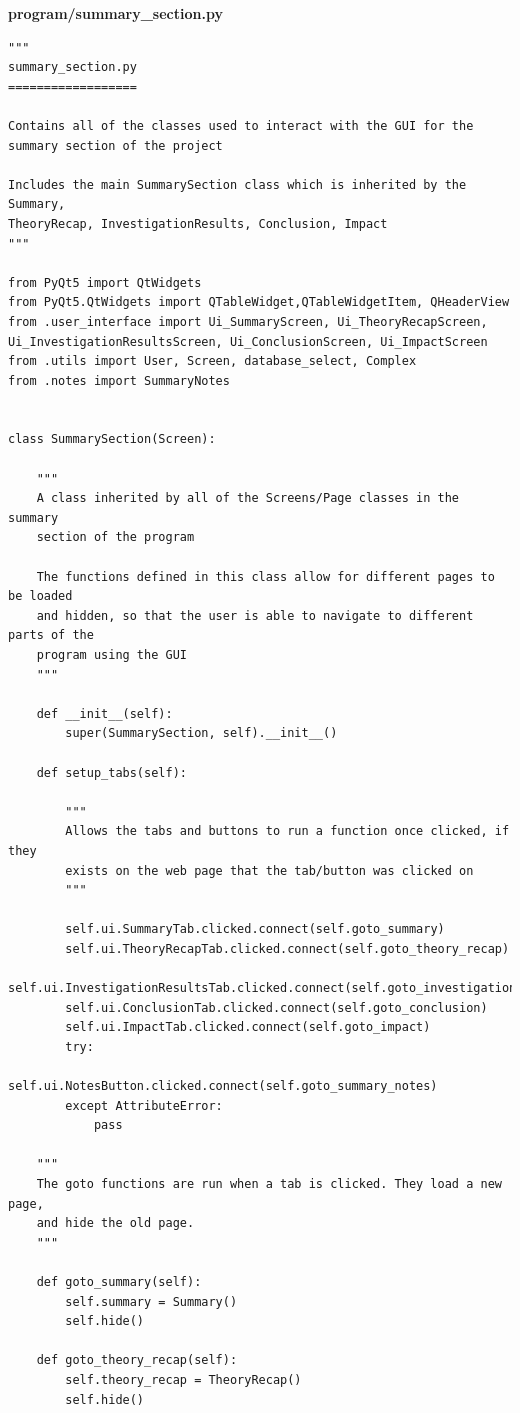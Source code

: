 \documentclass{article}
\begin{document}
\clearpage
\textbf{program/summary\_section.py}

\begin{lstlisting}
"""
summary_section.py
==================

Contains all of the classes used to interact with the GUI for the
summary section of the project

Includes the main SummarySection class which is inherited by the Summary,
TheoryRecap, InvestigationResults, Conclusion, Impact
"""

from PyQt5 import QtWidgets
from PyQt5.QtWidgets import QTableWidget,QTableWidgetItem, QHeaderView
from .user_interface import Ui_SummaryScreen, Ui_TheoryRecapScreen, Ui_InvestigationResultsScreen, Ui_ConclusionScreen, Ui_ImpactScreen
from .utils import User, Screen, database_select, Complex
from .notes import SummaryNotes


class SummarySection(Screen):

    """
    A class inherited by all of the Screens/Page classes in the summary
    section of the program

    The functions defined in this class allow for different pages to be loaded
    and hidden, so that the user is able to navigate to different parts of the
    program using the GUI
    """

    def __init__(self):
        super(SummarySection, self).__init__()

    def setup_tabs(self):

        """
        Allows the tabs and buttons to run a function once clicked, if they
        exists on the web page that the tab/button was clicked on
        """

        self.ui.SummaryTab.clicked.connect(self.goto_summary)
        self.ui.TheoryRecapTab.clicked.connect(self.goto_theory_recap)
        self.ui.InvestigationResultsTab.clicked.connect(self.goto_investigation_results)
        self.ui.ConclusionTab.clicked.connect(self.goto_conclusion)
        self.ui.ImpactTab.clicked.connect(self.goto_impact)
        try:
            self.ui.NotesButton.clicked.connect(self.goto_summary_notes)
        except AttributeError:
            pass

    """
    The goto functions are run when a tab is clicked. They load a new page,
    and hide the old page.
    """

    def goto_summary(self):
        self.summary = Summary()
        self.hide()

    def goto_theory_recap(self):
        self.theory_recap = TheoryRecap()
        self.hide()


\end{lstlisting}
\end{document}
